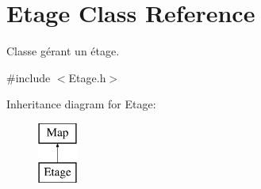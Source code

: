\hypertarget{classEtage}{\section{Etage Class Reference}
\label{classEtage}
}


Classe gérant un étage.  




{\ttfamily \#include $<$Etage.\-h$>$}

Inheritance diagram for Etage\-:\begin{figure}[H]
\begin{center}
\leavevmode
\includegraphics[height=2.000000cm]{classEtage}
\end{center}
\end{figure}
